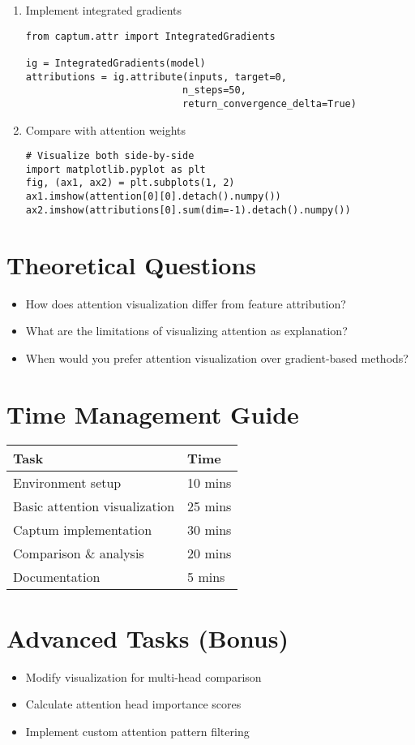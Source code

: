 \begin{enumerate}
\item Implement integrated gradients
\begin{verbatim}
from captum.attr import IntegratedGradients

ig = IntegratedGradients(model)
attributions = ig.attribute(inputs, target=0, 
                           n_steps=50, 
                           return_convergence_delta=True)
\end{verbatim}

\item Compare with attention weights
\begin{verbatim}
# Visualize both side-by-side
import matplotlib.pyplot as plt
fig, (ax1, ax2) = plt.subplots(1, 2)
ax1.imshow(attention[0][0].detach().numpy())
ax2.imshow(attributions[0].sum(dim=-1).detach().numpy())
\end{verbatim}
\end{enumerate}

\section*{Theoretical Questions}
\begin{itemize}
\item How does attention visualization differ from feature attribution?
\item What are the limitations of visualizing attention as explanation?
\item When would you prefer attention visualization over gradient-based methods?
\end{itemize}

\section*{Time Management Guide}
\begin{tabular}{|l|l|}
\hline
\textbf{Task} & \textbf{Time} \\ \hline
Environment setup & 10 mins \\ \hline
Basic attention visualization & 25 mins \\ \hline
Captum implementation & 30 mins \\ \hline
Comparison \& analysis & 20 mins \\ \hline
Documentation & 5 mins \\ \hline
\end{tabular}

\section*{Advanced Tasks (Bonus)}
\begin{itemize}
\item Modify visualization for multi-head comparison
\item Calculate attention head importance scores
\item Implement custom attention pattern filtering
\end{itemize}

